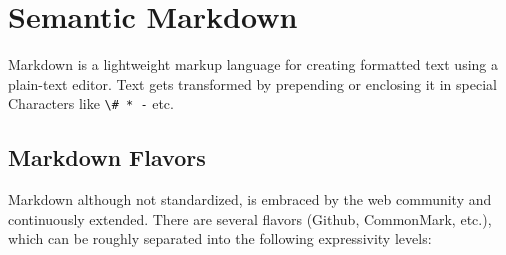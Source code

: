 \chapter{Semantic Markdown} \label{ch:markdown}






Markdown is a lightweight markup language for creating formatted text using a plain-text editor. Text gets transformed by prepending or enclosing it in special Characters like \verb|\# * -| etc.

\section{Markdown Flavors}

Markdown although not standardized, is embraced by the web community and continuously extended. There are several flavors (Github, CommonMark, etc.), which can be roughly separated into the following expressivity levels:

